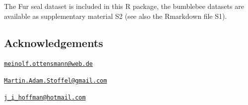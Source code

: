The Fur seal dataset is included in this R package, the bumblebee
datasets are available as supplementary material S2 (see also the
Rmarkdown file S1).

\subsection{Acknowledgements}\label{acknowledgements}



\address{%
Meinolf Ottensmann\\
Department of Animal Behaviour\\
Bielefeld University\\ Morgenbreede 45\\ 33615 Bielefeld\\
}
\href{mailto:meinolf.ottensmann@web.de}{\nolinkurl{meinolf.ottensmann@web.de}}

\address{%
Martin A. Stoffel\\
Department of Animal Behaviour\\
Bielefeld University\\ Morgenbreede 45\\ 33615 Bielefeld\\
}
\href{mailto:Martin.Adam.Stoffel@gmail.com}{\nolinkurl{Martin.Adam.Stoffel@gmail.com}}

\address{%
Joseph I. Hoffman\\
Department of Animal Behaviour\\
Bielefeld University\\ Morgenbreede 45\\ 33615 Bielefeld\\
}
\href{mailto:j_i_hoffman@hotmail.com}{\nolinkurl{j\_i\_hoffman@hotmail.com}}

